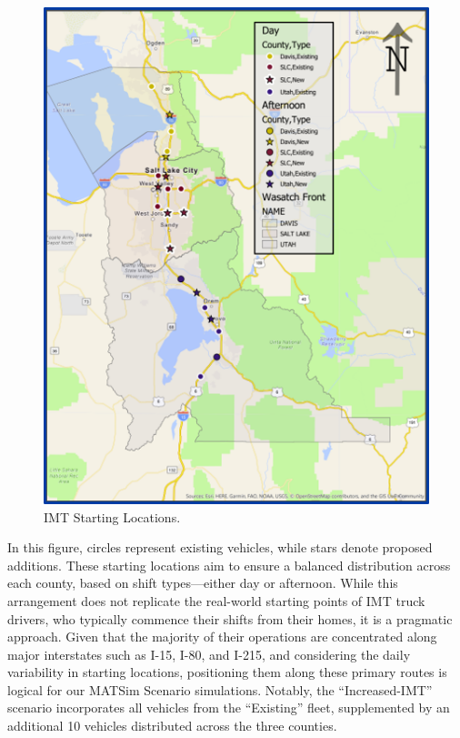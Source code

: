 \documentclass[fancy, oneside, mastersfancy, ms]{byuthesis}
\begin{document}
\begin{figure}

{\centering \includegraphics{figures/imt_map.png}

}

\caption{\label{fig-IMT_Map}IMT Starting Locations.}

\end{figure}

In this figure, circles represent existing vehicles, while stars denote
proposed additions. These starting locations aim to ensure a balanced
distribution across each county, based on shift types---either day or
afternoon. While this arrangement does not replicate the real-world
starting points of IMT truck drivers, who typically commence their
shifts from their homes, it is a pragmatic approach. Given that the
majority of their operations are concentrated along major interstates
such as I-15, I-80, and I-215, and considering the daily variability in
starting locations, positioning them along these primary routes is
logical for our MATSim Scenario simulations. Notably, the
``Increased-IMT'' scenario incorporates all vehicles from the
``Existing'' fleet, supplemented by an additional 10 vehicles
distributed across the three counties.
\end{document}

